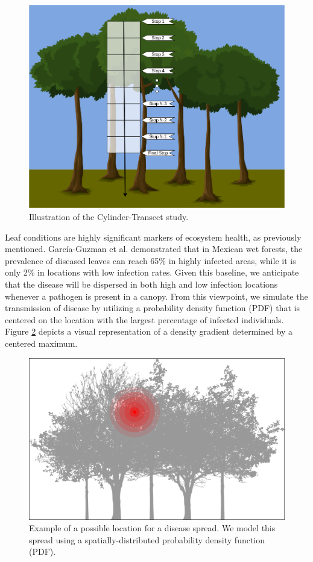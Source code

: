 \begin{figure}[h]
    \centering
    \includegraphics[width = .8\linewidth]{Figures/pin-cylinder.png}
    \caption{Illustration of the Cylinder-Transect study.}
    \label{fig:cylinder}
\end{figure}

Leaf conditions are highly significant markers of ecosystem health, as previously mentioned. García-Guzman et al. \cite{garcia2004incidence} demonstrated that in Mexican wet forests, the prevalence of diseased leaves can reach 65\% in highly infected areas, while it is only 2\% in locations with low infection rates. Given this baseline, we anticipate that the disease will be dispersed in both high and low infection locations whenever a pathogen is present in a canopy. From this viewpoint, we simulate the transmission of disease by utilizing a probability density function (PDF) that is centered on the location with the largest percentage of infected individuals. Figure \ref{fig:canopy-disease-spread} depicts a visual representation of a density gradient determined by a centered maximum.

\begin{figure}[h]
    \centering
    \includegraphics[width = .8\linewidth]{Figures/diseased-canopy.png}
    \caption{\color{black}Example of a possible location for a disease spread. We model this spread using a spatially-distributed probability density function (PDF).}
    \label{fig:canopy-disease-spread}
\end{figure}

